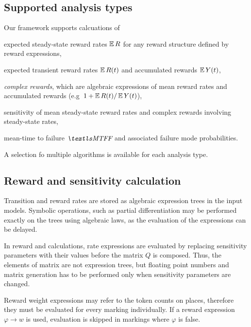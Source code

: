 \subsection{Supported analysis types}

Our framework supports calcuations of
\begin{itemize*}
\item expected steady-state reward rates $\operatorname{\mathbb{E}} R$ for any reward
  structure defined by reward expressions,
\item expected transient reward rates $\operatorname{\mathbb{E}} R(t)$ and accumulated
  rewards $\operatorname{\mathbb{E}} Y(t)$,
\item \emph{complex rewards}, which are algebraic expressions of mean
  reward rates and accumulated rewards
  (e.g~$1 + \operatorname{\mathbb{E}} R(t) / \operatorname{\mathbb{E}} Y(t)$),
\item sensitivity of mean steady-state reward rates and complex
  rewards involving steady-state rates,
\item mean-time to failure $\MTFF$ and associated failure mode
  probabilities.
\end{itemize*}
A selection fo multiple algorithms is available for each analysis
type.

\subsection{Reward and sensitivity calculation}

Transition and reward rates are stored as algebraic expression trees
in the input  models. Symbolic operations, such as partial
differentiation may be performed exactly on the trees using algebraic
laws, as the evaluation of the expressions can be delayed.

In reward and  calculations, rate expressions are
evaluated by replacing sensitivity parameters with their values before
the matrix $Q$ is composed. Thus, the elements of matrix are not
expression trees, but floating point numbers and matrix generation
has to be performed only when sensitivity parameters are changed.

Reward weight expressions may refer to the token counts on places,
therefore they must be evaluated for every marking individually. If a
 reward expression $\varphi \rightarrow w$ is used,
evaluation is skipped in markings where $\varphi$ is false.

